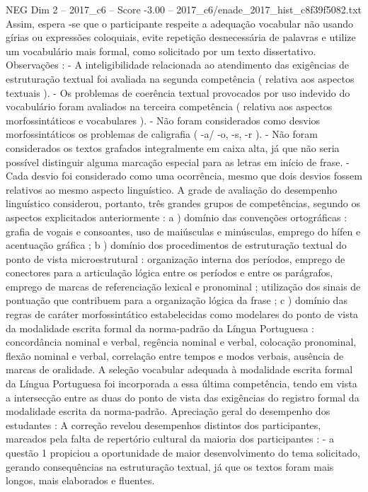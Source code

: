\begin{textsample}{NEG Dim 2 – 2017\_c6 – Score -3.00 – 2017\_c6/enade\_2017\_hist\_c8f39f5082.txt}
Assim, espera -se que o participante respeite a adequação vocabular não usando gírias ou expressões coloquiais, evite repetição desnecessária de palavras e utilize um vocabulário mais formal, como solicitado por um texto dissertativo.
Observações : - A inteligibilidade relacionada ao atendimento das exigências de estruturação textual foi avaliada na segunda competência ( relativa aos aspectos textuais ). - Os problemas de coerência textual provocados por uso indevido do vocabulário foram avaliados na terceira competência ( relativa aos aspectos morfossintáticos e vocabulares ). - Não foram considerados como desvios morfossintáticos os problemas de caligrafia ( -a/ -o, -s, -r ). - Não foram considerados os textos grafados integralmente em caixa alta, já que não seria possível distinguir alguma marcação especial para as letras em início de frase. - Cada desvio foi considerado como uma ocorrência, mesmo que dois desvios fossem relativos ao mesmo aspecto linguístico.
A grade de avaliação do desempenho linguístico considerou, portanto, três grandes grupos de competências, segundo os aspectos explicitados anteriormente : a ) domínio das convenções ortográficas : grafia de vogais e consoantes, uso de maiúsculas e minúsculas, emprego do hífen e acentuação gráfica ; b ) domínio dos procedimentos de estruturação textual do ponto de vista microestrutural : organização interna dos períodos, emprego de conectores para a articulação lógica entre os períodos e entre os parágrafos, emprego de marcas de referenciação lexical e pronominal ; utilização dos sinais de pontuação que contribuem para a organização lógica da frase ; c ) domínio das regras de caráter morfossintático estabelecidas como modelares do ponto de vista da modalidade escrita formal da norma-padrão da Língua Portuguesa : concordância nominal e verbal, regência nominal e verbal, colocação pronominal, flexão nominal e verbal, correlação entre tempos e modos verbais, ausência de marcas de oralidade.
A seleção vocabular adequada à modalidade escrita formal da Língua Portuguesa foi incorporada a essa última competência, tendo em vista a intersecção entre as duas do ponto de vista das exigências do registro formal da modalidade escrita da norma-padrão.
Apreciação geral do desempenho dos estudantes : A correção revelou desempenhos distintos dos participantes, marcados pela falta de repertório cultural da maioria dos participantes : - a questão 1 propiciou a oportunidade de maior desenvolvimento do tema solicitado, gerando consequências na estruturação textual, já que os textos foram mais longos, mais elaborados e fluentes.

\end{textsample}
